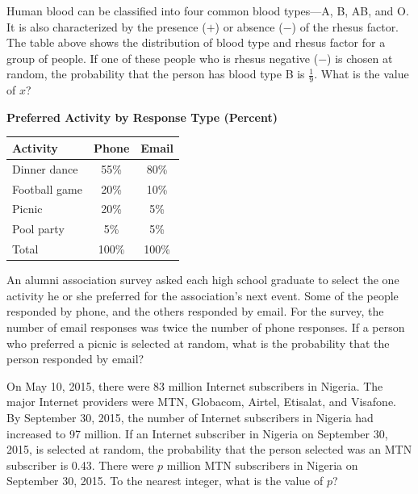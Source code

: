\vspace{1em}

Human blood can be classified into four common blood types—A, B, AB, and O.  
It is also characterized by the presence ($+$) or absence ($-$) of the rhesus factor.  
The table above shows the distribution of blood type and rhesus factor for a group of people.  
If one of these people who is rhesus negative ($-$) is chosen at random, the probability that the person has blood type B is $\frac{1}{9}$.  
What is the value of $x$?

\vspace{0.75em}


\vspace{2em}

\newpage
\noindent\markforreview

\begin{center}
    

\textbf{Preferred Activity by Response Type (Percent)}

\vspace{0.5em}
\begin{tabular}{|l|c|c|}
\hline
Activity & Phone & Email \\
\hline
Dinner dance & 55\% & 80\% \\
Football game & 20\% & 10\% \\
Picnic & 20\% & 5\% \\
Pool party & 5\% & 5\% \\
\hline
Total & 100\% & 100\% \\
\hline
\end{tabular}
\end{center}


An alumni association survey asked each high school graduate to select the one activity he or she preferred for the association’s next event.  
Some of the people responded by phone, and the others responded by email.  
For the survey, the number of email responses was twice the number of phone responses.  
If a person who preferred a picnic is selected at random, what is the probability that the person responded by email?



\vspace{2em}

\noindent\markforreview
\vspace{1em}

On May 10, 2015, there were 83 million Internet subscribers in Nigeria.  
The major Internet providers were MTN, Globacom, Airtel, Etisalat, and Visafone.  
By September 30, 2015, the number of Internet subscribers in Nigeria had increased to 97 million.  
If an Internet subscriber in Nigeria on September 30, 2015, is selected at random, the probability that the person selected was an MTN subscriber is 0.43.  
There were $p$ million MTN subscribers in Nigeria on September 30, 2015.  
To the nearest integer, what is the value of $p$?

